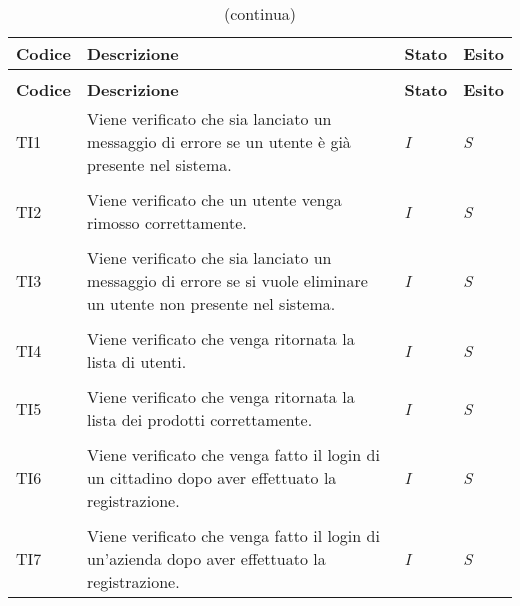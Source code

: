 		\begin{longtable}{ >{\centering}p{} >{}p{}
				>{\centering}p{} >{\centering}p{}}
			
			\caption{Riepilogo Test di Integrazione}\\	
			\rowcolorhead
			\textbf{\color{white}Codice} 
			& \centering\textbf{\color{white}Descrizione} 
			& \centering\textbf{\color{white}Stato}
			& \centering\textbf{\color{white}Esito} 
			\tabularnewline %
			\endfirsthead	
			
			\rowcolor{white}\caption[]{(continua)}\\	
			\rowcolorhead
			\textbf{\color{white}Codice} 
			& \centering\textbf{\centering\color{white}Descrizione} 
			& \centering\textbf{\color{white}Stato}
			& \centering\textbf{\color{white}Esito} 
			\tabularnewline %
			\endhead	
			
			
			\hypertarget{TI1}{TI1} & Viene verificato che sia lanciato un messaggio di 
			errore se un utente è già presente nel sistema. & \textit{I} & \textit{S}\\ 
			
			\tabularnewline
			\hypertarget{TI2}{TI2} & Viene verificato che un utente venga rimosso 
			correttamente. & \textit{I} & \textit{S}\\
			
			\tabularnewline
			\hypertarget{TI3}{TI3} & Viene verificato che sia lanciato un messaggio di 
			errore se si vuole eliminare un utente non presente nel sistema. & \textit{I} & 
			\textit{S}\\
			
			\tabularnewline
			\hypertarget{TI4}{TI4} & Viene verificato che venga ritornata la lista di 
			utenti. & \textit{I} & \textit{S}\\
			
			\tabularnewline
			\hypertarget{TI5}{TI5} & Viene verificato che venga ritornata la lista dei 
			prodotti correttamente. & \textit{I} & \textit{S}\\
			
			\tabularnewline
			\hypertarget{TI6}{TI6} & Viene verificato che venga fatto il login di un 
			cittadino dopo aver effettuato la registrazione. & \textit{I} & \textit{S}\\
			
			\tabularnewline
			\hypertarget{TI7}{TI7} & Viene verificato che venga fatto il login di 
			un'azienda dopo aver effettuato la registrazione. & \textit{I} & \textit{S}\\
			

\end{longtable}
